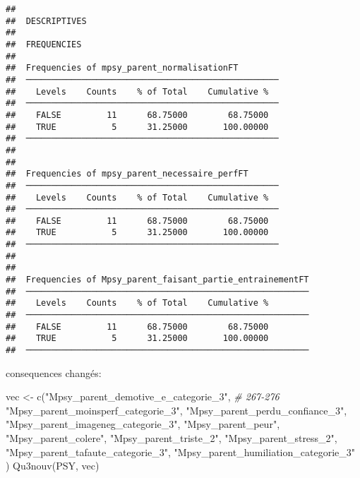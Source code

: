 \documentclass[
]{article}
\newenvironment{Shaded}{\begin{snugshade}}{\end{snugshade}}
\newcommand{\CommentTok}[1]{\textcolor[rgb]{0.56,0.35,0.01}{\textit{#1}}}
\newcommand{\FunctionTok}[1]{\textcolor[rgb]{0.00,0.00,0.00}{#1}}
\newcommand{\NormalTok}[1]{#1}
\newcommand{\OtherTok}[1]{\textcolor[rgb]{0.56,0.35,0.01}{#1}}
\newcommand{\StringTok}[1]{\textcolor[rgb]{0.31,0.60,0.02}{#1}}
\begin{document}
\begin{verbatim}
## 
##  DESCRIPTIVES
## 
##  FREQUENCIES
## 
##  Frequencies of mpsy_parent_normalisationFT         
##  ────────────────────────────────────────────────── 
##    Levels    Counts    % of Total    Cumulative %   
##  ────────────────────────────────────────────────── 
##    FALSE         11      68.75000        68.75000   
##    TRUE           5      31.25000       100.00000   
##  ────────────────────────────────────────────────── 
## 
## 
##  Frequencies of mpsy_parent_necessaire_perfFT       
##  ────────────────────────────────────────────────── 
##    Levels    Counts    % of Total    Cumulative %   
##  ────────────────────────────────────────────────── 
##    FALSE         11      68.75000        68.75000   
##    TRUE           5      31.25000       100.00000   
##  ────────────────────────────────────────────────── 
## 
## 
##  Frequencies of Mpsy_parent_faisant_partie_entrainementFT 
##  ──────────────────────────────────────────────────────── 
##    Levels    Counts    % of Total    Cumulative %   
##  ──────────────────────────────────────────────────────── 
##    FALSE         11      68.75000        68.75000   
##    TRUE           5      31.25000       100.00000   
##  ────────────────────────────────────────────────────────
\end{verbatim}

consequences changés:

\begin{Shaded}
\begin{Highlighting}[]
\NormalTok{vec }\OtherTok{\textless{}{-}} \FunctionTok{c}\NormalTok{(}\StringTok{"Mpsy\_parent\_demotive\_e\_categorie\_3"}\NormalTok{,      }\CommentTok{\# 267{-}276}
         \StringTok{"Mpsy\_parent\_moinsperf\_categorie\_3"}\NormalTok{,}
         \StringTok{"Mpsy\_parent\_perdu\_confiance\_3"}\NormalTok{,}
         \StringTok{"Mpsy\_parent\_imageneg\_categorie\_3"}\NormalTok{,}
         \StringTok{"Mpsy\_parent\_peur"}\NormalTok{,}
         \StringTok{"Mpsy\_parent\_colere"}\NormalTok{,}
         \StringTok{"Mpsy\_parent\_triste\_2"}\NormalTok{,}
         \StringTok{"Mpsy\_parent\_stress\_2"}\NormalTok{,}
         \StringTok{"Mpsy\_parent\_tafaute\_categorie\_3"}\NormalTok{,}
        \StringTok{"Mpsy\_parent\_humiliation\_categorie\_3"} 
\NormalTok{)}
\FunctionTok{Qu3nouv}\NormalTok{(PSY, vec)}
\end{Highlighting}
\end{Shaded}
\end{document}
